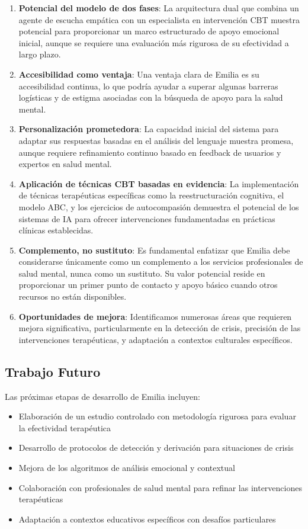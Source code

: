 \documentclass[conference]{IEEEtran}
\begin{document}
\begin{enumerate}
\item \textbf{Potencial del modelo de dos fases}: La arquitectura dual que combina un agente de escucha empática con un especialista en intervención CBT muestra potencial para proporcionar un marco estructurado de apoyo emocional inicial, aunque se requiere una evaluación más rigurosa de su efectividad a largo plazo.

\item \textbf{Accesibilidad como ventaja}: Una ventaja clara de Emilia es su accesibilidad continua, lo que podría ayudar a superar algunas barreras logísticas y de estigma asociadas con la búsqueda de apoyo para la salud mental.

\item \textbf{Personalización prometedora}: La capacidad inicial del sistema para adaptar sus respuestas basadas en el análisis del lenguaje muestra promesa, aunque requiere refinamiento continuo basado en feedback de usuarios y expertos en salud mental.

\item \textbf{Aplicación de técnicas CBT basadas en evidencia}: La implementación de técnicas terapéuticas específicas como la reestructuración cognitiva, el modelo ABC, y los ejercicios de autocompasión \cite{b17} demuestra el potencial de los sistemas de IA para ofrecer intervenciones fundamentadas en prácticas clínicas establecidas. 

\item \textbf{Complemento, no sustituto}: Es fundamental enfatizar que Emilia debe considerarse únicamente como un complemento a los servicios profesionales de salud mental, nunca como un sustituto. Su valor potencial reside en proporcionar un primer punto de contacto y apoyo básico cuando otros recursos no están disponibles.

\item \textbf{Oportunidades de mejora}: Identificamos numerosas áreas que requieren mejora significativa, particularmente en la detección de crisis, precisión de las intervenciones terapéuticas, y adaptación a contextos culturales específicos.
\end{enumerate}

\subsection{Trabajo Futuro}
Las próximas etapas de desarrollo de Emilia incluyen:

\begin{itemize}
\item Elaboración de un estudio controlado con metodología rigurosa para evaluar la efectividad terapéutica
\item Desarrollo de protocolos de detección y derivación para situaciones de crisis
\item Mejora de los algoritmos de análisis emocional y contextual
\item Colaboración con profesionales de salud mental para refinar las intervenciones terapéuticas
\item Adaptación a contextos educativos específicos con desafíos particulares
\end{itemize}
\end{document}
